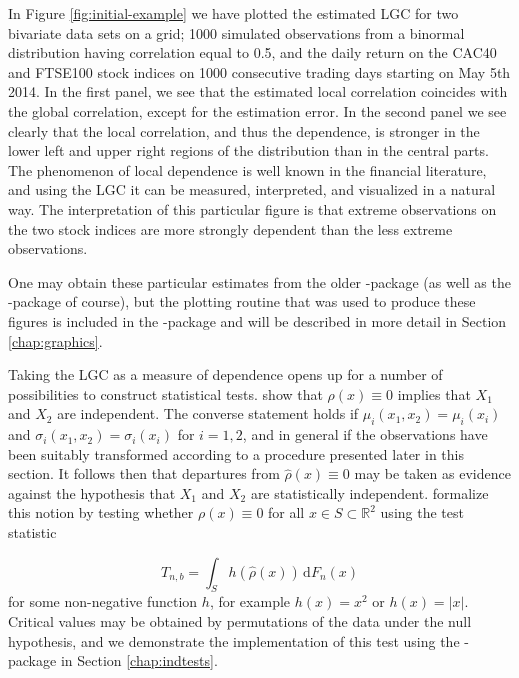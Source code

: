 In Figure \ref{fig:initial-example} we have plotted the estimated LGC for two bivariate data sets on a grid; 1000 simulated observations from a binormal distribution having correlation equal to 0.5, and the daily return on the CAC40 and FTSE100 stock indices on 1000 consecutive trading days starting on May 5th 2014. In the first panel, we see that the estimated local correlation coincides with the global correlation, except for the estimation error. In the second panel we see clearly that the local correlation, and thus the dependence, is stronger in the lower left and upper right regions of the distribution than in the central parts. The phenomenon of local dependence is well known in the financial literature, and using the LGC it can be measured, interpreted, and visualized in a natural way. The interpretation of this particular figure is that extreme observations on the two stock indices are more strongly dependent than the less extreme observations. 

One may obtain these particular estimates from the older -package (as well as the -package of course), but the plotting routine that was used to produce these figures is included in the -package and will be described in more detail in Section \ref{chap:graphics}.

Taking the LGC as a measure of dependence opens up for a number of possibilities to construct statistical tests. \citet{bere:tjos:2014} show that $\rho(x) \equiv 0$ implies that $X_1$ and $X_2$ are independent. The converse statement holds if $\mu_i(x_1, x_2) = \mu_i(x_i)$ and $\sigma_i(x_1, x_2) = \sigma_i(x_i)$ for $i=1,2$, and in general if the observations have been suitably transformed according to a procedure presented later in this section. It follows then that departures from $\widehat\rho(x) \equiv 0$ may be taken as evidence against the hypothesis that $X_1$ and $X_2$ are statistically independent. \citet{bere:tjos:2014} formalize this notion by testing whether $\rho(x) \equiv 0$ for all $x\in S \subset \mathbb{R}^2$ using the test statistic

\begin{equation}
T_{n,b} = \int_S h\left(\widehat \rho(x) \right) \,\textrm{d}F_n(x)
\label{eq:test-statistic1}
\end{equation}
for some non-negative function $h$, for example $h(x) = x^2$ or $h(x) = |x|$. Critical values may be obtained by permutations of the data under the null hypothesis, and we demonstrate the implementation of this test using the -package in Section \ref{chap:indtests}.

